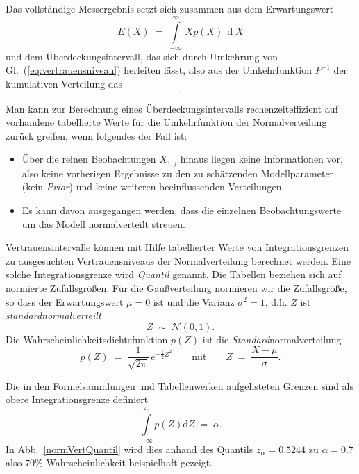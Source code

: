 Das vollständige Messergebnis setzt sich zusammen aus dem Erwartungswert
\begin{equation}
E(X) \; = \; \int\limits_{-\infty}^\infty \, X  p(X) \, \operatorname{d} X
\end{equation}
und dem Über\-deck\-ungs\-intervall, das sich durch Umkehrung von Gl.~(\ref{eq:vertrauensniveau})
herleiten lässt, also aus der Umkehrfunktion $P^{-1}$ der kumulativen Verteilung das
\begin{equation}
[P^{-1}(\frac{\alpha}{2}), P^{-1}(1-\frac{\alpha}{2})] .
\end{equation}

Man kann zur Berechnung eines Überdeckungsintervalls
rechenzeiteffizient auf vorhandene tabellierte Werte für
die Umkehrfunktion der Normalverteilung zurück greifen, wenn
folgendes der Fall ist:
\begin{itemize}
\item Über die reinen Beobachtungen $X_{1,j}$ hinaus liegen keine
Informationen vor, also keine vorherigen Ergebnisse zu den zu
schätzenden Modellparameter (kein \textsl{Prior})
und keine weiteren beeinflussenden Verteilungen.
\item Es kann davon ausgegangen werden, dass die
einzelnen Beobachtungswerte um das Modell
normalverteilt streuen.
\end{itemize}
Vertrauensintervalle können mit Hilfe
tabellierter Werte von Integrationsgrenzen zu ausgesuchten Ver\-trauens\-niveaus
der Normalverteilung berechnet werden. Eine solche Integrationsgrenze wird \textsl{Quantil}
genannt. Die Tabellen beziehen sich auf normierte Zufallsgrößen.
Für die Gaußverteilung normieren wir die Zufallsgröße, so dass der
Erwartungswert $\mu = 0$ ist und die Varianz $\sigma^2 = 1$, d.h.
$Z$ ist \textsl{standardnormalverteilt}
\begin{equation}
Z \; \sim \; \mathcal{N}(0,1) .
\label{standardNormalverteilt}
\end{equation}
Die Wahrscheinlichkeitsdichtefunktion $p(Z)$ ist die \textsl{Standard}normalverteilung
\begin{equation}
p(Z) \; = \; \frac{1}{\sqrt{2 \pi}} \, e^{-\frac{1}{2} Z^2}
\qquad \textrm{mit} \qquad Z \; = \; \frac{X - \mu}{\sigma} .
\end{equation}

Die in den Formelsammlungen und Tabellenwerken aufgelisteten Grenzen sind
als obere Integrationsgrenze definiert
\begin{equation}
\int\limits_{-\infty}^{z_\alpha} p(Z) \mathrm{d} Z \; = \; \alpha .
\label{WahrscheinlichkeitQuantil}
\end{equation}
In Abb.~\ref{normVertQuantil} wird dies anhand des Quantils $z_\alpha = 0.5244$
zu $\alpha = 0.7$ also $70 \%$ Wahrscheinlichkeit beispielhaft gezeigt.

